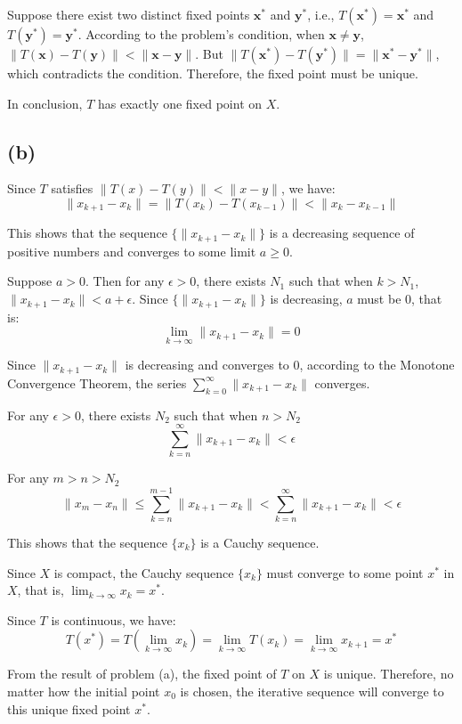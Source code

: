 \documentclass{article}
\begin{document}
Suppose there exist two distinct fixed points $ \mathbf{x}^* $ and $ \mathbf{y}^* $, i.e., $ T(\mathbf{x}^*) = \mathbf{x}^* $ and $ T(\mathbf{y}^*) = \mathbf{y}^* $. According to the problem's condition, when $ \mathbf{x} \neq \mathbf{y} $, $ \|T(\mathbf{x}) - T(\mathbf{y})\| < \|\mathbf{x} - \mathbf{y}\| $. But $ \|T(\mathbf{x}^*) - T(\mathbf{y}^*)\| = \|\mathbf{x}^* - \mathbf{y}^*\| $, which contradicts the condition. Therefore, the fixed point must be unique.  

In conclusion, $ T $ has exactly one fixed point on $ X $.  

\subsection*{(b)} 
Since $T$ satisfies $\|T(x) - T(y)\| < \|x - y\|$, we have:
$$
\|x_{k + 1} - x_k\| = \|T(x_k) - T(x_{k - 1})\| < \|x_k - x_{k - 1}\|
$$

This shows that the sequence $\{\|x_{k + 1} - x_k\|\}$ is a decreasing sequence of positive numbers and converges to some limit $a \geq 0$.

Suppose $a > 0$. Then for any $\epsilon > 0$, there exists $N_1$ such that when $k > N_1$, $\|x_{k + 1} - x_k\| < a + \epsilon$. Since $\{\|x_{k + 1} - x_k\|\}$ is decreasing, $a$ must be $0$, that is:
$$
\lim_{k \to \infty} \|x_{k + 1} - x_k\| = 0
$$

Since $\|x_{k + 1} - x_k\|$ is decreasing and converges to $0$, according to the Monotone Convergence Theorem, the series $\sum_{k = 0}^{\infty} \|x_{k + 1} - x_k\|$ converges.

For any $\epsilon > 0$, there exists $N_2$ such that when $n > N_2$
$$
\sum_{k = n}^{\infty} \|x_{k + 1} - x_k\| < \epsilon
$$

For any $m > n > N_2$
$$\|x_m - x_n\| \leq \sum_{k = n}^{m - 1} \|x_{k + 1} - x_k\| < \sum_{k = n}^{\infty} \|x_{k + 1} - x_k\| < \epsilon$$

This shows that the sequence $\{x_k\}$ is a Cauchy sequence.

Since $ X $ is compact, the Cauchy sequence $ \{x_k\} $ must converge to some point $ x^* $ in $ X $, that is, $ \lim_{k \to \infty} x_k = x^* $.

Since $ T $ is continuous, we have:
$$
T(x^*) = T\left( \lim_{k \to \infty} x_k \right) = \lim_{k \to \infty} T(x_k) = \lim_{k \to \infty} x_{k + 1} = x^*
$$

From the result of problem (a), the fixed point of $ T $ on $ X $ is unique. Therefore, no matter how the initial point $ x_0 $ is chosen, the iterative sequence will converge to this unique fixed point $ x^* $.
\end{document}
